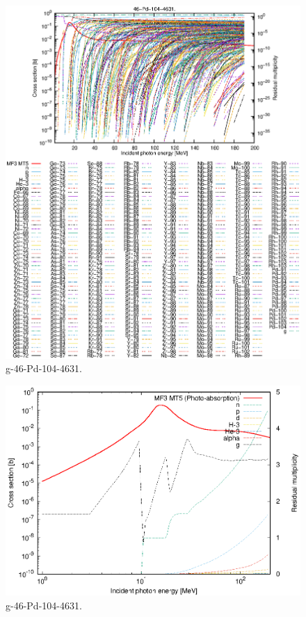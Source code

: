 \begin{figure}
 \includegraphics[width=\linewidth]{eps/g_46-Pd-104_4631.eps}
  \caption{g-46-Pd-104-4631.}
\end{figure}
\newpage \clearpage

\begin{figure}
 \includegraphics[width=\linewidth]{eps-log/g_46-Pd-104_4631.eps}
 \caption{g-46-Pd-104-4631.}
\end{figure}
\newpage \clearpage

